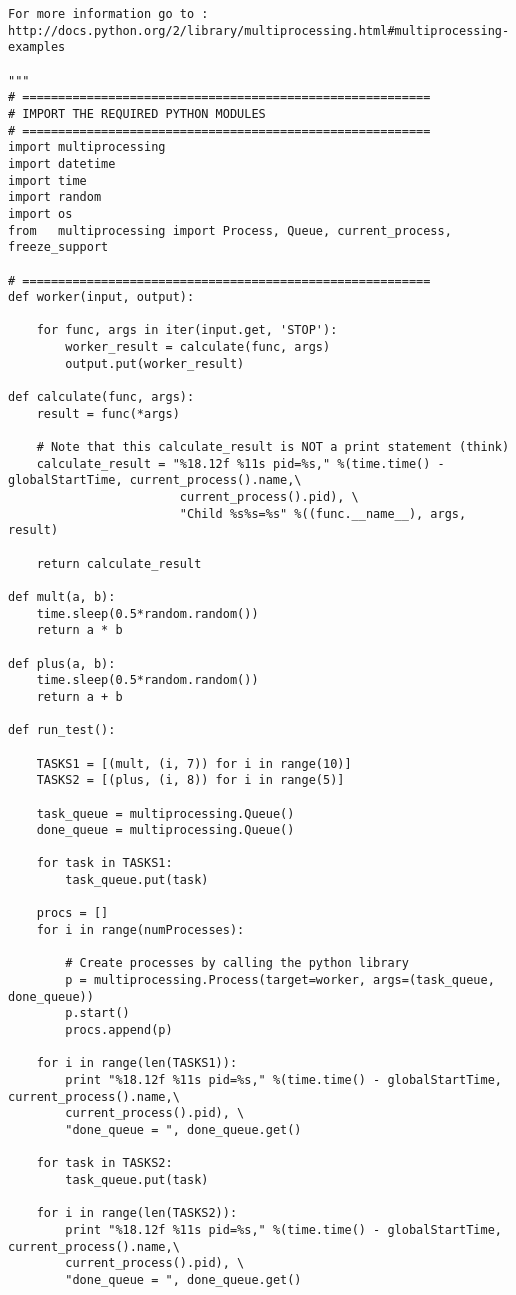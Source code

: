 \begin{lstlisting}[caption={App4-Python Parallel Multiprocessing Codes}, label=App4-Python Parallel Multiprocessing Codes]
For more information go to : 
http://docs.python.org/2/library/multiprocessing.html#multiprocessing-examples

"""
# =========================================================
# IMPORT THE REQUIRED PYTHON MODULES
# =========================================================
import multiprocessing
import datetime
import time
import random
import os
from   multiprocessing import Process, Queue, current_process, freeze_support

# =========================================================
def worker(input, output):

	for func, args in iter(input.get, 'STOP'):
		worker_result = calculate(func, args)
		output.put(worker_result)

def calculate(func, args):
	result = func(*args)

	# Note that this calculate_result is NOT a print statement (think)
	calculate_result = "%18.12f %11s pid=%s," %(time.time() - globalStartTime, current_process().name,\	
						current_process().pid), \
						"Child %s%s=%s" %((func.__name__), args, result)

	return calculate_result

def mult(a, b):
	time.sleep(0.5*random.random())
	return a * b

def plus(a, b):
	time.sleep(0.5*random.random())
	return a + b

def run_test():

	TASKS1 = [(mult, (i, 7)) for i in range(10)]
	TASKS2 = [(plus, (i, 8)) for i in range(5)]
	
	task_queue = multiprocessing.Queue()
	done_queue = multiprocessing.Queue()

	for task in TASKS1:
		task_queue.put(task)
	
	procs = []
	for i in range(numProcesses):
	
		# Create processes by calling the python library
		p = multiprocessing.Process(target=worker, args=(task_queue, done_queue))
		p.start()
		procs.append(p)
	
	for i in range(len(TASKS1)):
		print "%18.12f %11s pid=%s," %(time.time() - globalStartTime, current_process().name,\
		current_process().pid), \
		"done_queue = ", done_queue.get()
	
	for task in TASKS2:
		task_queue.put(task)
	
	for i in range(len(TASKS2)):
		print "%18.12f %11s pid=%s," %(time.time() - globalStartTime, current_process().name,\
		current_process().pid), \
		"done_queue = ", done_queue.get()
	

\end{lstlisting}
